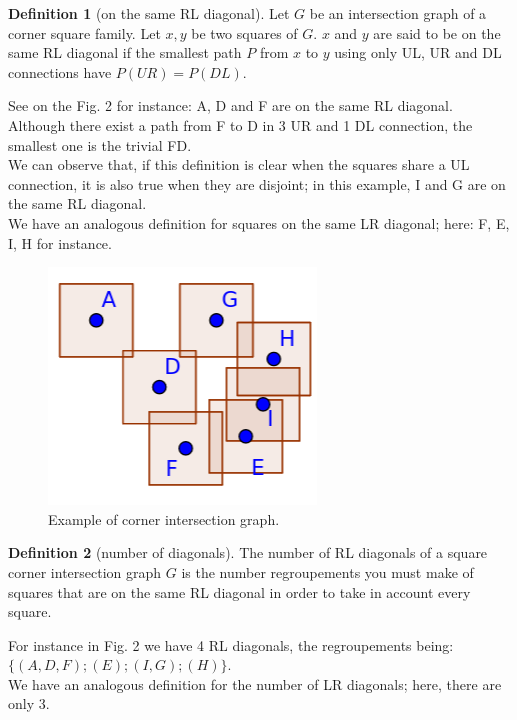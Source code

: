 \documentclass[12pt]{article}
\theoremstyle{definition}
\newtheorem{definition}{Definition}[section]
\theoremstyle{remark}
\begin{document}
\begin{definition}[on the same RL diagonal] %
    Let $G$ be an intersection graph of a corner square family. Let $x, y$ be two squares of $G$. $x$ and $y$ are said to be on the same RL diagonal
    if the smallest path $P$ from $x$ to $y$ using only UL, UR and DL connections have $P(UR) = P(DL)$. 
\end{definition}

See on the Fig. 2 for instance: A, D and F are on the same RL diagonal. Although there exist a path from F to D in 3 UR and 1 DL connection, the smallest one is the trivial FD. \\
We can observe that, if this definition is clear when the squares share a UL connection, it is also true when they are disjoint; in this example, I and G are on the same RL diagonal.\\
We have an analogous definition for squares on the same LR diagonal; here: F, E, I, H for instance.

\begin{figure}[h]
    \centering
    \includegraphics[scale=0.3]{tex_images/same_diagonals.png}
    \caption{Example of corner intersection graph.}
\end{figure}

\begin{definition}[number of diagonals]
    The number of RL diagonals of a square corner intersection graph $G$ is the number regroupements you must make of squares that are on the same RL diagonal in order to take in account every square.

\end{definition}

For instance in Fig. 2 we have 4 RL diagonals, the regroupements being: $\{(A, D, F); (E); (I, G); (H) \}$.\\
We have an analogous definition for the number of LR diagonals; here, there are only 3.
\end{document}
